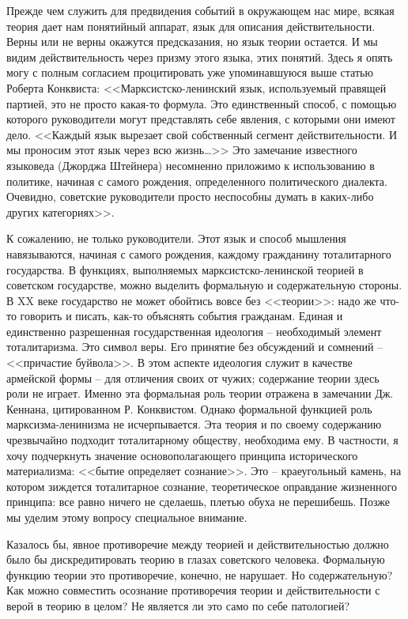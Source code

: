 \documentclass{book}
\begin{document}
Прежде чем служить для предвидения событий в окружаю­щем нас мире, всякая теория дает нам понятийный аппарат, язык для описания 
действительности. Верны или не верны окажутся предсказания, но язык теории остается. И мы видим действительность через призму 
этого языка, этих понятий. Здесь я опять могу с полным согласием процитировать уже упоминавшуюся выше статью Роберта Конквиста:
<<Марксистско-ленинский язык, используемый правящей пар­тией, это не просто какая-то формула. Это единственный спо­соб, с помощью 
которого руководители могут представлять себе явления, с которыми они имеют дело. <<Каждый язык вырезает свой собственный сегмент 
действительности. И мы проносим этот язык через всю жизнь\ldots>> Это замечание извест­ного языковеда (Джорджа Штейнера) 
несомненно приложимо к использованию в политике, начиная с самого рождения, опре­деленного политического диалекта. Очевидно, 
советские ру­ководители просто неспособны думать в каких-либо других категориях>>.

К сожалению, не только руководители. Этот язык и способ мышления навязываются, начиная с самого рождения, каждому гражданину 
тоталитарного государства. В функциях, выполняемых марксистско-ленинской теорией в советском государстве, можно выделить 
формальную и содержательную стороны. В XX веке государство не может обойтись вовсе без <<теории>>: надо же что-то говорить и 
писать, как-то объяснять события гражданам. Единая и единственно разрешенная государственная идеология -- необходимый элемент 
тоталитаризма. Это символ веры. Его принятие без обсуждений и сомнений -- <<причастие буйвола>>. В этом аспекте идеология служит в 
качестве армейской формы -- для отличения своих от чужих; содержание теории здесь роли не играет. Именно эта формальная роль 
теории отражена в замечании Дж. Кеннана, цитированном Р. Конквистом. Однако формальной функцией роль марксизма-ленинизма не 
исчерпывается. Эта теория и по своему содержанию чрезвычайно подходит тоталитарному обществу, необходима ему. В частности, я 
хочу подчеркнуть значение основополагающего прин­ципа исторического материализма: <<бытие определяет сознание>>. Это -- 
краеугольный камень, на котором зиждется тоталитарное сознание, теоретическое оправдание жизненного принципа: все равно ничего 
не сделаешь, плетью обуха не перешибешь. Позже мы уделим этому вопросу специальное внимание.

Казалось бы, явное противоречие между теорией и действительностью должно было бы дискредитировать теорию в глазах советского 
человека. Формальную функцию теории это противоречие, конечно, не нарушает. Но содержательную? Как можно совместить осознание 
противоречия теории и действительности с верой в теорию в целом? Не является ли это само по себе патологией?
\end{document}
